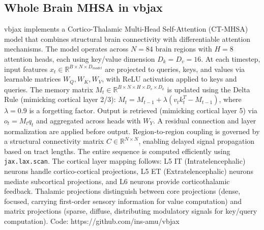 \subsection{Whole Brain MHSA in vbjax}\label{sec:mhsa-brief}

vbjax implements a Cortico-Thalamic Multi-Head Self-Attention (CT-MHSA) model that combines structural brain connectivity with differentiable attention mechanisms. The model operates across $N=84$ brain regions with $H=8$ attention heads, each using key/value dimension $D_k=D_v=16$. At each timestep, input features $x_t \in \mathbb{R}^{B \times N \times D_{model}}$ are projected to queries, keys, and values via learnable matrices $W_Q, W_K, W_V$, with ReLU activation applied to keys and queries. The memory matrix $M_t \in \mathbb{R}^{B \times N \times H \times D_v \times D_k}$ is updated using the Delta Rule (mimicking cortical layer 2/3): $M_t = M_{t-1} + \lambda(v_t k_t^T - M_{t-1})$, where $\lambda=0.9$ is a forgetting factor. Output is retrieved (mimicking cortical layer 5) via $o_t = M_t q_t$ and aggregated across heads with $W_Y$. A residual connection and layer normalization are applied before output. Region-to-region coupling is governed by a structural connectivity matrix $C \in \mathbb{R}^{N \times N}$, enabling delayed signal propagation based on tract lengths. The entire sequence is computed efficiently using \texttt{jax.lax.scan}. The cortical layer mapping follows: L5 IT (Intratelencephalic) neurons handle cortico-cortical projections, L5 ET (Extratelencephalic) neurons mediate subcortical projections, and L6 neurons provide corticothalamic feedback. Thalamic projections distinguish between core projections (dense, focused, carrying first-order sensory information for value computation) and matrix projections (sparse, diffuse, distributing modulatory signals for key/query computation). Code: https://github.com/ins-amu/vbjax